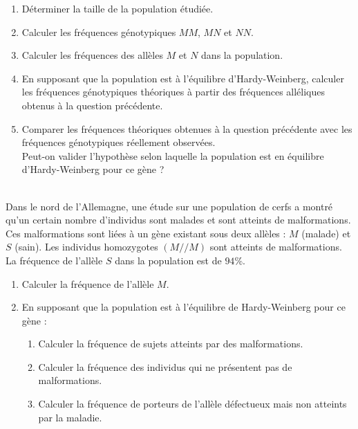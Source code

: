 \documentclass[11pt]{article}
\begin{document}
\begin{enumerate}[leftmargin=*]
	\item Déterminer la taille de la population étudiée.
	\item Calculer les fréquences génotypiques $MM$, $MN$ et $NN$.
	\item Calculer les fréquences des allèles $M$ et $N$ dans la population.
	\item En supposant que la population est à l’équilibre d’Hardy-Weinberg, calculer les fréquences génotypiques théoriques à partir des fréquences alléliques obtenus à la question précédente.
	\item Comparer les fréquences théoriques obtenues à la question précédente avec les fréquences génotypiques réellement observées. \\
	Peut-on valider l’hypothèse selon laquelle la population 	est en équilibre d’Hardy-Weinberg pour ce gène ?
\end{enumerate}

\vspace{11pt}

\exercice \\

Dans le nord de l'Allemagne, une étude sur une population de cerfs a montré
qu'un certain nombre d'individus sont malades et sont atteints de malformations. Ces
malformations sont liées à un gène existant sous deux allèles : $M$ (malade) et
$S$ (sain). Les individus homozygotes $(M//M)$ sont atteints de malformations.
La fréquence de l'allèle $S$ dans la population est de $94$\%.

\begin{enumerate}[leftmargin=*]
	\item Calculer la fréquence de l’allèle $M$.
	\item En supposant que la population est à l’équilibre de Hardy-Weinberg pour ce gène :
	\begin{enumerate}[leftmargin=*,label=\alph*.]
		\item Calculer la fréquence de sujets atteints par des malformations.
		\item Calculer la fréquence des individus qui ne présentent pas de
          malformations.
		\item Calculer la fréquence de porteurs de l’allèle défectueux mais non
          atteints par la maladie.
	\end{enumerate}
\end{enumerate}
\end{document}
